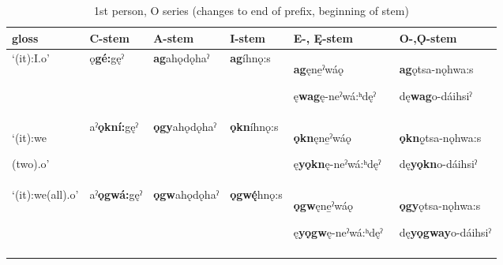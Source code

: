 \begin{table}
\caption{1st person, O series (changes to end of prefix, beginning of stem)}
\label{tab:1:1ppron2}
\tiny{
\begin{tabularx}{\textwidth}{XXXXXX}
\lsptoprule
gloss & C-stem & A-stem & I-stem & E-, Ę{}-stem & O-,Ǫ{}-stem\\
\midrule
‘(it):I.o’ & ǫ\textbf{gé:}gęˀ & \textbf{ag}ahǫdǫhaˀ & \textbf{ag}íhnǫ:s & \textbf{ag}ęne̱ˀwáǫ

ę\textbf{wag}ę-neˀwá:ʰdęˀ & \textbf{ag}ǫtsa-nǫhwa:s

dę\textbf{wag}o-dáihsiˀ\\
‘(it):we

(two).o’ & aˀ\textbf{ǫkní:}gęˀ & \textbf{ǫgy}ahǫdǫhaˀ & \textbf{ǫkn}íhnǫ:s & \textbf{ǫkn}ęne̱ˀwáǫ

ę\textbf{yǫkn}ę-neˀwá:ʰdęˀ & \textbf{ǫkn}ǫ̱tsa-nǫhwa:s

dę\textbf{yǫkn}o-dáihsiˀ\\
‘(it):we(all).o’ & aˀ\textbf{ǫgwá:}gęˀ & \textbf{ǫgw}ahǫdǫhaˀ & \textbf{ǫgw\'{ę}}hnǫ:s & \textbf{ǫgw}ęne̱ˀwáǫ

ę\textbf{yǫgw}ę-neˀwá:ʰdęˀ~ & \textbf{ǫgy}ǫtsa-nǫhwa:s

dę\textbf{yǫgway}o-dáihsiˀ\\
\lspbottomrule
\end{tabularx}}
\end{table}


